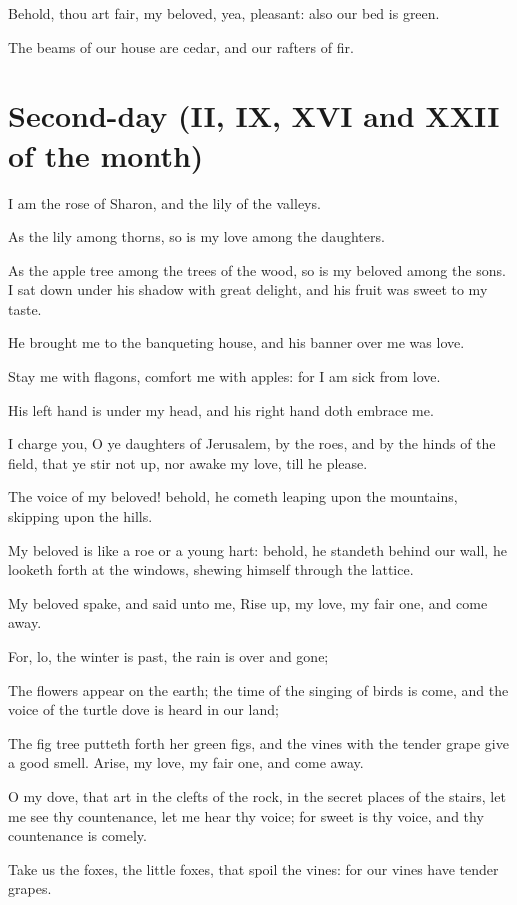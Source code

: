 Behold, thou art fair, my beloved, yea, pleasant: also our bed is green.

The beams of our house are cedar, and our rafters of fir.

\section*{Second-day (II, IX, XVI and XXII of the month)}

I am the rose of Sharon, and the lily of the valleys.

As the lily among thorns, so is my love among the daughters.

As the apple tree among the trees of the wood, so is my beloved among the sons. I sat down under his shadow with great delight, and his fruit was sweet to my taste.

He brought me to the banqueting house, and his banner over me was love.

 Stay me with flagons, comfort me with apples: for I am sick from love.

His left hand is under my head, and his right hand doth embrace me.

I charge you, O ye daughters of Jerusalem, by the roes, and by the hinds of the field, that ye stir not up, nor awake my love, till he please.

The voice of my beloved! behold, he cometh leaping upon the mountains, skipping upon the hills.

My beloved is like a roe or a young hart: behold, he standeth behind our wall, he looketh forth at the windows, shewing himself through the lattice.

My beloved spake, and said unto me, Rise up, my love, my fair one, and come away.

For, lo, the winter is past, the rain is over and gone;

 The flowers appear on the earth; the time of the singing of birds is come, and the voice of the turtle dove is heard in our land;

The fig tree putteth forth her green figs, and the vines with the tender grape give a good smell. Arise, my love, my fair one, and come away.

O my dove, that art in the clefts of the rock, in the secret places of the stairs, let me see thy countenance, let me hear thy voice; for sweet is thy voice, and thy countenance is comely.

Take us the foxes, the little foxes, that spoil the vines: for our vines have tender grapes.

